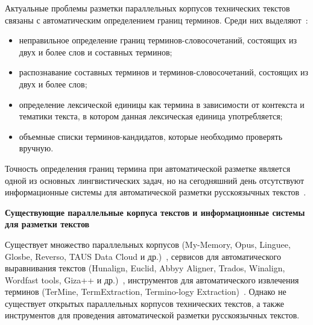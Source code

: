 \documentclass[a4paper,oneside,14pt]{article}
\begin{document}
Актуальные проблемы разметки параллельных корпусов технических текстов связаны с автоматическим определением границ терминов.
Среди них выделяют~\cite{butenko2022}:
\begin{itemize}
    \item неправильное определение границ терминов-словосочетаний, состоящих из двух и более слов и составных терминов; 
    \item распознавание составных терминов и терминов-словосочетаний, состоящих из двух и более слов;
    \item определение лексической единицы как термина в зависимости от контекста и тематики текста, в котором данная лексическая единица употребляется; 
    \item объемные списки терминов-кандидатов, которые необходимо проверять вручную.
\end{itemize}

Точность определения границ термина при автоматической разметке является одной из основных лингвистических задач, но на сегодняшний день отсутствуют информационные системы для автоматической разметки русскоязычных текстов~\cite{butenko2022}.

\textbf{Существующие параллельные корпуса текстов и информационные системы для разметки текстов}

Существует множество параллельных корпусов (My-Memory, Opus, Linguee, Glosbe, Reverso, TAUS Data Cloud и др.)~\cite{butenko2020-1}, сервисов для автоматического выравнивания текстов (Hunalign, Euclid, Abbyy Aligner, Trados, Winalign, Wordfast tools, Giza++ и др.)~\cite{cl2020},
инструментов для автоматического извлечения терминов (TerMine, TermExtraction, Termino-logy Extraction)~\cite{butenko2022}.
Однако не существует открытых параллельных корпусов технических текстов, а также инструментов для проведения автоматической разметки русскоязычных текстов.
\end{document}
